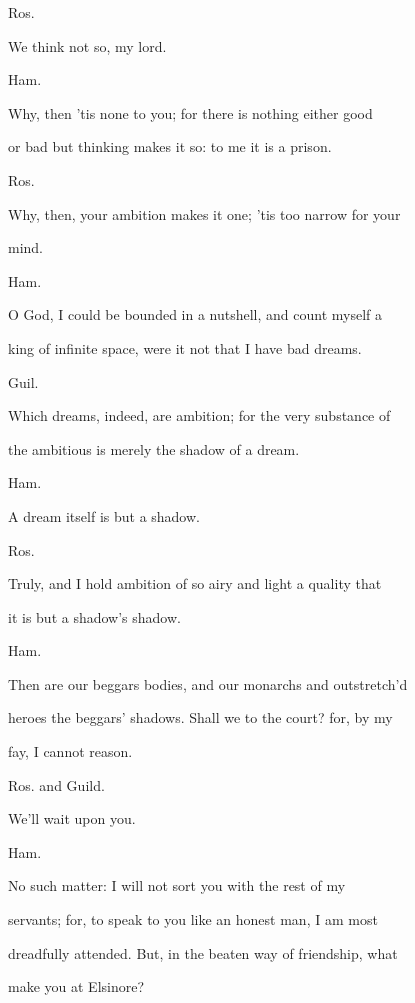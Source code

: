 \documentclass[12pt]{book}
\begin{document}
Ros.

We think not so, my lord.



Ham.

Why, then 'tis none to you; for there is nothing either good

or bad but thinking makes it so: to me it is a prison.



Ros.

Why, then, your ambition makes it one; 'tis too narrow for your

mind.



Ham.

O God, I could be bounded in a nutshell, and count myself a

king of infinite space, were it not that I have bad dreams.



Guil.

Which dreams, indeed, are ambition; for the very substance of

the ambitious is merely the shadow of a dream.



Ham.

A dream itself is but a shadow.



Ros.

Truly, and I hold ambition of so airy and light a quality that

it is but a shadow's shadow.



Ham.

Then are our beggars bodies, and our monarchs and outstretch'd

heroes the beggars' shadows. Shall we to the court? for, by my

fay, I cannot reason.



Ros. and Guild.

We'll wait upon you.



Ham.

No such matter: I will not sort you with the rest of my

servants; for, to speak to you like an honest man, I am most

dreadfully attended. But, in the beaten way of friendship, what

make you at Elsinore?
\end{document}
